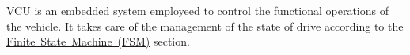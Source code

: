 V\+CU is an embedded system employeed to control the functional operations of the vehicle. It takes care of the management of the state of drive according to the \mbox{\hyperlink{_f_s_m_page}{Finite State Machine (F\+SM)}} section. 